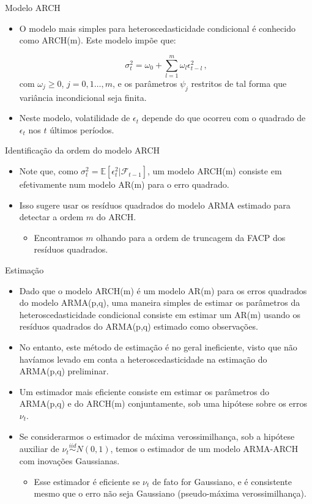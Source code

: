 \documentclass[11pt]{beamer}
\begin{document}
\begin{frame}{Modelo ARCH}
\begin{itemize}
	\item O modelo mais simples para heteroscedasticidade condicional é conhecido como {\color{blue}ARCH(m)}. Este modelo impõe que:
	
	$$\sigma^2_t = \omega_0 +\sum_{l=1}^m \omega_l \epsilon_{t-l}^2 \, ,$$
	com $\omega_j \geq 0$, $j=0,1\ldots, m$, e os parâmetros  $\psi_j$ restritos de tal forma que variância incondicional seja finita.
	\item Neste modelo, volatilidade de $\epsilon_t$ depende do que ocorreu com o quadrado  de $\epsilon_t$ nos $t$ últimos períodos.
	
\end{itemize}
\end{frame}

\begin{frame}{Identificação da ordem do modelo ARCH}
	\begin{itemize}
		\item Note que, como $\sigma^2_t= \mathbb{E}[\epsilon^2_t|\mathcal{F}_{t-1}]$, um modelo ARCH(m) consiste em efetivamente num modelo AR(m) para o erro quadrado.
		\item Isso sugere usar os resíduos quadrados do modelo ARMA estimado para detectar  a ordem $m$ do ARCH.
		\begin{itemize}
			\item Encontramos $m$ olhando para a ordem de truncagem da FACP dos resíduos quadrados.
		\end{itemize}
	\end{itemize}
\end{frame}

\begin{frame}{Estimação}
\begin{itemize}
	\item Dado que o modelo ARCH(m) é um modelo AR(m) para os erros quadrados do modelo ARMA(p,q), uma maneira simples de estimar os parâmetros da heteroscedasticidade condicional consiste em estimar um AR(m) usando os resíduos quadrados do ARMA(p,q) estimado como observações.
	\item No entanto, este método de estimação é no geral ineficiente, visto que não havíamos levado em conta a heteroscedasticidade na estimação do ARMA(p,q) preliminar.
	\item Um estimador mais eficiente consiste em estimar os parâmetros do ARMA(p,q) e do ARCH(m) {\color{blue}conjuntamente}, sob uma hipótese sobre os erros $\nu_t$.
	\item Se considerarmos o estimador de máxima verossimilhança, sob a hipótese auxiliar de $\nu_t \overset{iid}{\sim} N(0,1)$, temos o estimador de um modelo ARMA-ARCH com inovações Gaussianas.
	\begin{itemize}
		\item Esse estimador é eficiente se $\nu_t$ de fato for Gaussiano, e é consistente mesmo que o erro não seja Gaussiano (pseudo-máxima verossimilhança).
	\end{itemize}
\end{itemize}
\end{frame}
\end{document}
